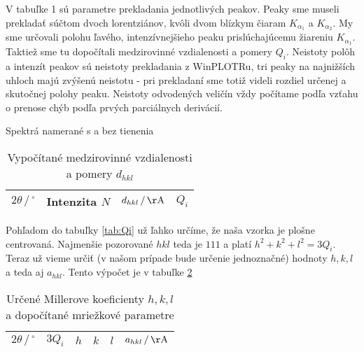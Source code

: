 \documentclass[a4paper, 10pt]{article}
\newcommand{\unit}[1]{\ensuremath{\, \mathrm{#1}}}
\begin{document}
V tabuľke 1 sú parametre prekladania jednotlivých peakov. Peaky sme museli prekladať súčtom dvoch lorentziánov, kvôli dvom blízkym čiaram $K_{\alpha_1}$ a $K_{\alpha_2}$. My sme určovali polohu ľavého, intenzívnejšieho peaku prislúchajúcemu žiareniu $K_{\alpha_1}$. Taktiež sme tu dopočítali medzirovinné vzdialenosti a pomery $Q_i$. Neistoty polôh a intenzít peakov sú neistoty prekladania z WinPLOTRu, tri peaky na najnižších uhloch majú zvýšenú neistotu - pri prekladaní sme totiž videli rozdiel určenej a skutočnej polohy peaku. Neistoty odvodených veličín vždy počítame podľa vzťahu o prenose chýb podľa prvých parciálnych derivácií.

\begin{graph}[h!]
\centering
\vspace*{-15pt}

\caption{ Spektrá namerané s a bez tienenia \label{graph:spektrum}}
\end{graph}


\begin{table}[h!]
\centering
\hspace*{30pt}
\begin{tabular}{c|c|c|c}
$ 2\theta \,/\,^\circ $ & 
Intenzita $N$ &
$ d_{hkl}\,/\unit{\AA}$ & 
$ Q_i$ 
\\
\midrule 

\end{tabular}
\newline
\vspace*{2pt}
\caption{Vypočítané medzirovinné vzdialenosti a pomery $d_{hkl}$\label{tab:Qi_merane}}
\end{table}

Pohľadom do tabuľky \ref{tab:Qi} už ľahko určíme, že naša vzorka je plošne centrovaná. Najmenšie pozorované $hkl$ teda je $111$ a platí $h^2 + k^2 + l^2 = 3Q_i$. Teraz už vieme určiť (v našom prípade bude určenie jednoznačné) hodnoty $h, k, l$ a teda aj $a_{hkl}$. Tento výpočet je v tabuľke \ref{tab:ahkl}

\begin{table}[h!]
\centering
\hspace*{30pt}
\begin{tabular}{c|c|ccc|c}
$ 2\theta \,/\,^\circ $ & 
$3Q_i$ &
$h$ &
$k$ &
$l$ &
$a_{hkl}\,/\unit{\AA}$
\\
\midrule 

\end{tabular}
\newline
\vspace*{2pt}
\caption{Určené Millerove koeficienty $h, k, l$ a dopočítané mriežkové parametre \label{tab:ahkl}}
\end{table}
\end{document}
